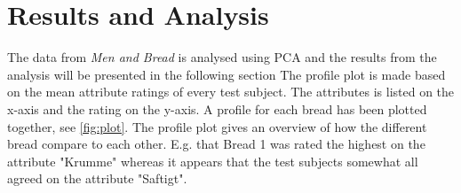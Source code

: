 \section*{Results and Analysis}
\label{Results}
The data from \textit{Men and Bread} is analysed using PCA and the results from the analysis will be presented in the following section\blankline
%
%
The profile plot is made based on the mean attribute ratings of every test subject. The attributes is listed on the x-axis and the rating on the y-axis. A profile for each bread has been plotted together, see \autoref{fig:plot}. The profile plot gives an overview of how the different bread compare to each other. E.g. that Bread 1 was rated the highest on the attribute "Krumme" whereas it appears that the test subjects somewhat all agreed on the attribute "Saftigt".

